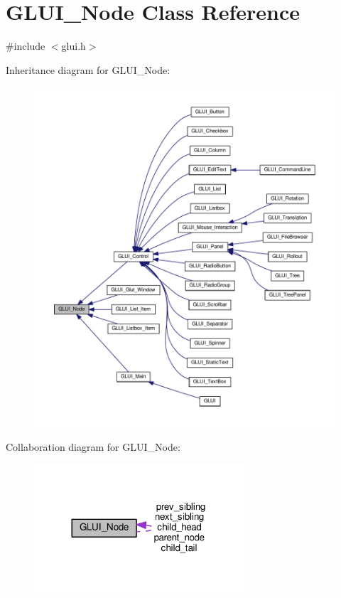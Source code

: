 \hypertarget{class_g_l_u_i___node}{\section{G\+L\+U\+I\+\_\+\+Node Class Reference}
\label{class_g_l_u_i___node}
}


{\ttfamily \#include $<$glui.\+h$>$}



Inheritance diagram for G\+L\+U\+I\+\_\+\+Node\+:\nopagebreak
\begin{figure}[H]
\begin{center}
\leavevmode
\includegraphics[width=350pt]{class_g_l_u_i___node__inherit__graph}
\end{center}
\end{figure}


Collaboration diagram for G\+L\+U\+I\+\_\+\+Node\+:\nopagebreak
\begin{figure}[H]
\begin{center}
\leavevmode
\includegraphics[width=221pt]{class_g_l_u_i___node__coll__graph}
\end{center}
\end{figure}
